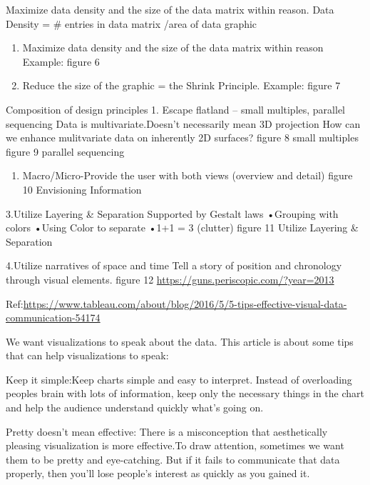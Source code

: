 \documentclass[]{book}
\providecommand{\tightlist}{%
  \setlength{\itemsep}{0pt}\setlength{\parskip}{0pt}}
\theoremstyle{definition}
\theoremstyle{definition}
\theoremstyle{definition}
\theoremstyle{remark}
\begin{document}
Maximize data density and the size of the data matrix within reason.
Data Density = \# entries in data matrix /area of data graphic

\begin{enumerate}
\def\labelenumi{\arabic{enumi}.}
\item
  Maximize data density and the size of the data matrix within reason
  Example: figure 6
\item
  Reduce the size of the graphic = the Shrink Principle. Example: figure
  7
\end{enumerate}

Composition of design principles 1. Escape flatland -- small multiples,
parallel sequencing Data is multivariate.Doesn't necessarily mean 3D
projection How can we enhance mulitvariate data on inherently 2D
surfaces? figure 8 small multiples figure 9 parallel sequencing

\begin{enumerate}
\def\labelenumi{\arabic{enumi}.}
\setcounter{enumi}{1}
\tightlist
\item
  Macro/Micro-Provide the user with both views (overview and detail)
  figure 10 Envisioning Information
\end{enumerate}

3.Utilize Layering \& Separation Supported by Gestalt laws •Grouping
with colors •Using Color to separate •1+1 = 3 (clutter) figure 11
Utilize Layering \& Separation

4.Utilize narratives of space and time Tell a story of position and
chronology through visual elements. figure 12
\url{https://guns.periscopic.com/?year=2013}

Ref:\url{https://www.tableau.com/about/blog/2016/5/5-tips-effective-visual-data-communication-54174}

We want visualizations to speak about the data. This article is about
some tips that can help visualizations to speak:

Keep it simple:Keep charts simple and easy to interpret. Instead of
overloading peoples brain with lots of information, keep only the
necessary things in the chart and help the audience understand quickly
what's going on.

Pretty doesn't mean effective: There is a misconception that
aesthetically pleasing visualization is more effective.To draw
attention, sometimes we want them to be pretty and eye-catching. But if
it fails to communicate that data properly, then you'll lose people's
interest as quickly as you gained it.
\end{document}

